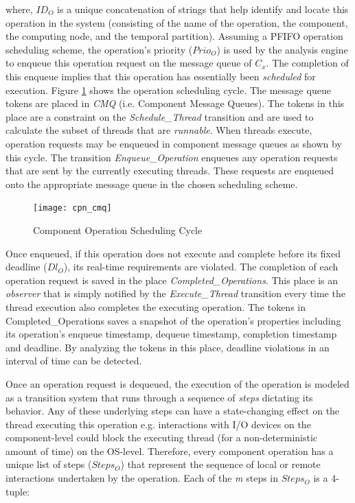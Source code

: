 where, $ID_O$ is a unique concatenation of strings that help identify and locate this operation in the system (consisting of the name of the operation, the component, the computing node, and the temporal partition). Assuming a PFIFO operation scheduling scheme, the operation's priority ($Prio_O$) is used by the analysis engine to enqueue this operation request on the message queue of $C_x$. The completion of this enqueue implies that this operation has essentially been \emph{scheduled} for execution. Figure \ref{fig:Operation_Scheduling} shows the operation scheduling cycle. The message queue tokens are placed in \emph{CMQ} (i.e. Component Message Queues). The tokens in this place are a constraint on the \emph{Schedule\_Thread} transition and are used to calculate the subset of threads that are \emph{runnable}. When threads execute, operation requests may be enqueued in component message queues as shown by this cycle. The transition  \emph{Enqueue\_Operation} enqueues any operation requests that are sent by the currently executing threads. These requests are enqueued onto the appropriate message queue in the chosen scheduling scheme. 

\begin{figure}[htb]
	\centering
	\texttt{[image: cpn\_cmq]}
	\caption{Component Operation Scheduling Cycle}
	\label{fig:Operation_Scheduling}
\end{figure}

Once enqueued, if this operation does not execute and complete before its fixed deadline ($Dl_O$), its real-time requirements are violated. The completion of each operation request is saved in the place \emph{Completed\_Operations}. This place is an \emph{observer} that is simply notified by the \emph{Execute\_Thread} transition every time the thread execution also completes the executing operation. The tokens in Completed\_Operations saves a snapshot of the operation's properties including its operation's enqueue timestamp, dequeue timestamp, completion timestamp and deadline. By analyzing the tokens in this place, deadline violations in an interval of time can be detected.  

Once an operation request is dequeued, the execution of the operation is modeled as a transition system that runs through a sequence of \emph{steps} dictating its behavior. Any of these underlying steps can have a state-changing effect on the thread executing this operation e.g. interactions with I/O devices on the component-level could block the executing thread (for a non-deterministic amount of time) on the OS-level. Therefore, every component operation has a unique list of steps ($Steps_O$) that represent the sequence of local or remote interactions undertaken by the operation. Each of the \emph{m} steps in $Steps_O$ is a 4-tuple:

